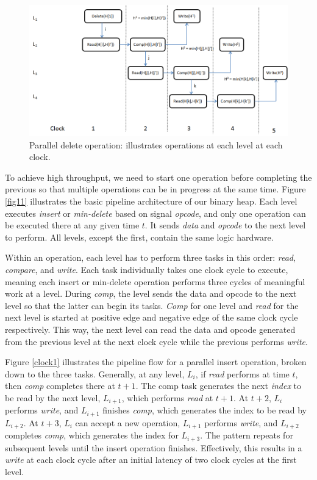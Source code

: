 \documentclass[10pt, conference, compsocconf]{IEEEtran}
\begin{document}
\begin{figure}[!ht]
  \centering
  \includegraphics[width=12cm]{Figures/clock2.png}
      \caption{Parallel delete operation: illustrates operations at each level at each clock.  }
    \label{clock2}
\end{figure}

To achieve high throughput, we need to start one operation before completing the previous so that multiple operations can be in progress at the same time.
Figure \ref{fig11} illustrates the basic pipeline architecture of our binary heap.
Each level executes {\it insert} or {\it min-delete} based on signal {\it opcode}, and only one operation can be executed there at any given time $t$.
It sends {\it data} and {\it opcode} to the next level to perform.
All levels, except the first, contain the same logic hardware.

Within an operation, each level has to perform three tasks in this order: {\it read}, {\it compare}, and {\it write}.
Each task individually takes one clock cycle to execute, meaning each insert or min-delete operation performs three cycles of meaningful work at a level.
During {\it comp}, the level sends the data and opcode to the next level so that the latter can begin its tasks.
{\it Comp} for one level and {\it read} for the next level is started at positive edge and negative edge of the same clock cycle respectively. This way, the next level can read the data and opcode generated from the previous level at the next clock cycle while the previous performs {\it write}.


Figure \ref{clock1} illustrates the pipeline flow for a parallel insert operation, broken down to the three tasks.
Generally, at any level, $L_i$, if {\it read} performs at time $t$, then {\it comp} completes there at $t+1$.
The comp task generates the next {\it index} to be read by the next level, $L_{i+1}$, which performs {\it read} at $t+1$.
At $t+2$, $L_i$ performs {\it write}, and $L_{i+1}$ finishes {\it comp}, which generates the index to be read by $L_{i+2}$.
At $t+3$, $L_i$ can accept a new operation, $L_{i+1}$ performs {\it write}, and $L_{i+2}$ completes {\it comp}, which generates the index for $L_{i+3}$. 
The pattern repeats for subsequent levels until the insert operation finishes.
Effectively, this results in a {\it write} at each clock cycle after an initial latency of two clock cycles at the first level.
\end{document}
